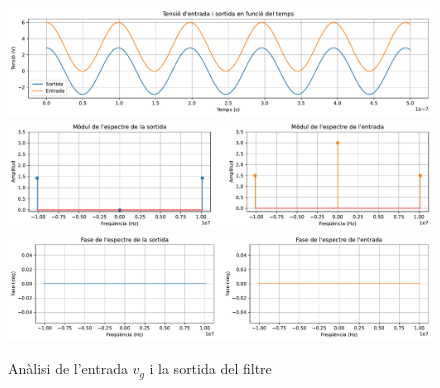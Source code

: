 \documentclass[catalan, a4paper, nobib]{tufte-handout}
\begin{document}
\begin{figure}
  \includegraphics[width=\linewidth]{sortida1.pdf}
  \includegraphics[width=\linewidth]{sortida2.pdf}
  \includegraphics[width=\linewidth]{sortida3.pdf}
  \caption{Anàlisi de l'entrada $v_g$ i la sortida del filtre}
\end{figure}
\end{document}
